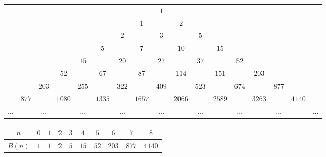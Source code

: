 {
\renewcommand*{\arraystretch}{1.5}
\setlength{\tabcolsep}{1pt}
\begin{longtable}{ccccccccccccccccc}
               &         &            &          &            &          &            &          & \(1\)      &          &            &          &            &          &            &          &            \\
               &         &            &          &            &          &            & \(1\)    &            & \(2\)    &            &          &            &          &            &          &            \\
               &         &            &          &            &          & \(2\)      &          & \(3\)      &          & \(5\)      &          &            &          &            &          &            \\
               &         &            &          &            & \(5\)    &            & \(7\)    &            & \(10\)   &            & \(15\)   &            &          &            &          &            \\
               &         &            &          & \(15\)     &          & \(20\)     &          & \(27\)     &          & \(37\)     &          & \(52\)     &          &            &          &            \\
               &         &            & \(52\)   &            & \(67\)   &            & \(87\)   &            & \(114\)  &            & \(151\)  &            & \(203\)  &            &          &            \\
               &         & \(203\)    &          & \(255\)    &          & \(322\)    &          & \(409\)    &          & \(523\)    &          & \(674\)    &          & \(877\)    &          &            \\
               & \(877\) &            & \(1080\) &            & \(1335\) &            & \(1657\) &            & \(2066\) &            & \(2589\) &            & \(3263\) &            & \(4140\) &            \\
    \(\ldots\) &         & \(\ldots\) &          & \(\ldots\) &          & \(\ldots\) &          & \(\ldots\) &          & \(\ldots\) &          & \(\ldots\) &          & \(\ldots\) &          & \(\ldots\) \\
\end{longtable}
}

{
\renewcommand*{\arraystretch}{1.5}
\setlength{\tabcolsep}{10pt}
\begin{longtable}{|c|c|c|c|c|c|c|c|c|c|}
    \hline
    \(n\)    & \(0\) & \(1\) & \(2\) & \(3\) & \(4\)  & \(5\)  & \(6\)   & \(7\)   & \(8\)    \\
    \hline
    \(B(n)\) & \(1\) & \(1\) & \(2\) & \(5\) & \(15\) & \(52\) & \(203\) & \(877\) & \(4140\) \\
    \hline
\end{longtable}
}

